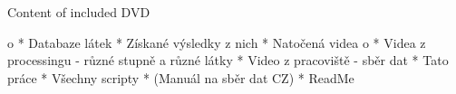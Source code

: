 \app Content of included DVD

		\Green
		\begitems \style o
			* Databaze látek
			* Získané výsledky z nich
			* Natočená videa
					\begitems \style o
						* Videa z processingu - různé stupně a různé látky
						* Video z pracoviště - sběr dat
					\enditems
			* Tato práce 
			* Všechny scripty
			* (Manuál na sběr dat CZ)
			* ReadMe
		\enditems
		\Black

